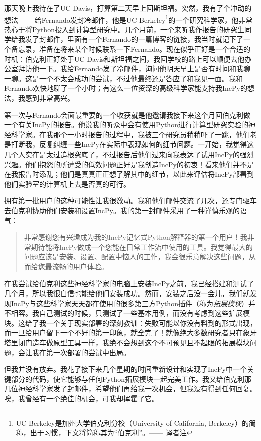 \documentclass[12pt,UTF8,nofonts]{book}
\begin{document}
那天晚上我待在了UC Davis，打算第二天早上回斯坦福。突然，我有了个冲动的想法—— 给Fernando发封冷邮件，他是UC Berkeley\footnote{UC Berkeley是加州大学伯克利分校（University of California, Berkeley）的简称，出于习惯，下文将简称其为“伯克利”。—— 译者注}的一个研究科学家，他非常热心于将Python投入到计算型研究中。几个月前，一个来听我作报告的研究生同学给我发了封邮件，里面有一个Fernando的一篇博客的链接，我当时就记下了一个备忘录，准备在将来某个时候联系一下Fernando。现在似乎正好是一个合适的时机：伯克利正好处于UC Davis和斯坦福之间，我回学校的路上可以顺便去他办公室拜访他一下。我给Fernando发了冷邮件，询问他明天早上是否有时间和我聊一聊。这是一个不太会成功的尝试，不过他最终还是答应了和我见一面。我和Fernando欢快地聊了一个小时；有这么一位资深的高级科学家能支持我IncPy的想法，我感到非常高兴。

第一次与Fernando会面最重要的一个收获就是他邀请我接下来这个月回伯克利做一个有关IncPy的报告。他说我的听众中会有使用Python进行计算型研究实验的神经科学家。在我那个一小时报告的过程中，我被三个研究员稍稍吓了一跳，他们老是打断我，反复纠缠一些IncPy在实际中表现如何的细节问题。一开始，我觉得这几个人实在是太过追根究底了，不过报告后他们过来向我表达了试用IncPy的强烈兴趣。他们抱怨的所遭受的低效问题正好是我创造IncPy的初衷！看来他们并不是在我报告时添乱；他们是真真正正想了解其中的细节，以此来评估将IncPy部署到他们实验室的计算机上去是否真的可行。

拥有第一批用户的这种可能性让我很激动。我和他们邮件交流了几次，还专门驱车去伯克利协助他们安装和设置IncPy。我的第一封邮件采用了一种谨慎乐观的语气：
\begin{quote}
  非常感谢您有兴趣成为我的IncPy记忆式Python解释器的第一个用户！我非常期待能将IncPy做成一个您能在日常工作流中使用的工具。我觉得最大的问题应该是安装、设置、配置中恼人的工作，我会很乐意解决这些问题，从而给您最流畅的用户体验。
\end{quote}

在我尝试给伯克利这些神经科学家的电脑上安装IncPy之前，我已经搭建和测试了几个月，所以我很自信也能给他们安装成功。然而，安装之后没一会儿，我们就发现IncPy与这些科学家天天都在使用的很多第三方Python插件（称为\emph{拓展模块}）并不相容。我自己测试的时候，只测试了一些基本用例，而没有考虑到这些扩展模块。这给了我一个关于现实部署的深刻教训：失败可能以你没有料到的形式出现，而一旦给用户留下一个不好的第一印象，就全完了！就像绝大多数研究者只在象牙塔里闭门造车做原型工具一样，我绝不会想到这个不可预见且不起眼的拓展模块问题，会让我在第一次部署的尝试中出局。

但我并没有放弃。我花了接下来几个星期的时间重新设计和实现了IncPy中一个关键部分的代码，使它能够与任何Python拓展模块一起完美工作。我又给伯克利那几位神经科学家发了封邮件，希望他们再给我一次机会，但我没有得到任何回复。唉，我曾经有一个绝佳的机会，可我却挥霍了它。
\end{document}

